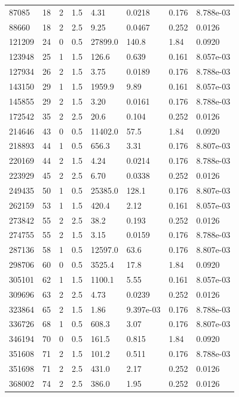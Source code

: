\documentclass[preview]{standalone}
\begin{document}
{{\begin{tabular}{L{1.2cm}C{1.2cm} C{0.3cm}C{0.5cm} C{1.4cm}C{1.4cm} C{1.4cm}C{1.4cm}}
  87085  &    18  & 2     & 1.5 &  4.31  & 0.0218  & 0.176 &  8.788e-03   \\ 
  88660  &    18  & 2     & 2.5 &  9.25  & 0.0467  & 0.252 &  0.0126   \\ 
  121209  &    24  & 0     & 0.5 &  27899.0  & 140.8  & 1.84 &  0.0920   \\ 
  123948  &    25  & 1     & 1.5 &  126.6  & 0.639  & 0.161 &  8.057e-03   \\ 
  127934  &    26  & 2     & 1.5 &  3.75  & 0.0189  & 0.176 &  8.788e-03   \\ 
  143150  &    29  & 1     & 1.5 &  1959.9  & 9.89  & 0.161 &  8.057e-03   \\ 
  145855  &    29  & 2     & 1.5 &  3.20  & 0.0161  & 0.176 &  8.788e-03   \\ 
  172542  &    35  & 2     & 2.5 &  20.6  & 0.104  & 0.252 &  0.0126   \\ 
  214646  &    43  & 0     & 0.5 &  11402.0  & 57.5  & 1.84 &  0.0920   \\ 
  218893  &    44  & 1     & 0.5 &  656.3  & 3.31  & 0.176 &  8.807e-03   \\ 
  220169  &    44  & 2     & 1.5 &  4.24  & 0.0214  & 0.176 &  8.788e-03   \\ 
  223929  &    45  & 2     & 2.5 &  6.70  & 0.0338  & 0.252 &  0.0126   \\ 
  249435  &    50  & 1     & 0.5 &  25385.0  & 128.1  & 0.176 &  8.807e-03   \\ 
  262159  &    53  & 1     & 1.5 &  420.4  & 2.12  & 0.161 &  8.057e-03   \\ 
  273842  &    55  & 2     & 2.5 &  38.2  & 0.193  & 0.252 &  0.0126   \\ 
  274755  &    55  & 2     & 1.5 &  3.15  & 0.0159  & 0.176 &  8.788e-03   \\ 
  287136  &    58  & 1     & 0.5 &  12597.0  & 63.6  & 0.176 &  8.807e-03   \\ 
  298706  &    60  & 0     & 0.5 &  3525.4  & 17.8  & 1.84 &  0.0920   \\ 
  305101  &    62  & 1     & 1.5 &  1100.1  & 5.55  & 0.161 &  8.057e-03   \\ 
  309696  &    63  & 2     & 2.5 &  4.73  & 0.0239  & 0.252 &  0.0126   \\ 
  323864  &    65  & 2     & 1.5 &  1.86  & 9.397e-03  & 0.176 &  8.788e-03   \\ 
  336726  &    68  & 1     & 0.5 &  608.3  & 3.07  & 0.176 &  8.807e-03   \\ 
  346194  &    70  & 0     & 0.5 &  161.5  & 0.815  & 1.84 &  0.0920   \\ 
  351608  &    71  & 2     & 1.5 &  101.2  & 0.511  & 0.176 &  8.788e-03   \\ 
  351698  &    71  & 2     & 2.5 &  431.0  & 2.17  & 0.252 &  0.0126   \\ 
  368002  &    74  & 2     & 2.5 &  386.0  & 1.95  & 0.252 &  0.0126   \\ 
\hline 
\end{tabular} 

}}
\end{document}
